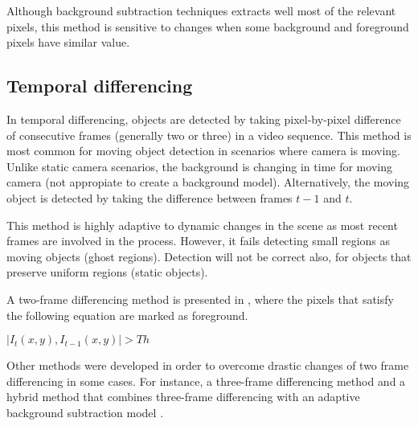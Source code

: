 Although background subtraction techniques extracts well most of the relevant pixels, this method is sensitive to changes when some background and foreground pixels have similar value.

\subsection{Temporal differencing}

In temporal differencing, objects are detected by taking pixel-by-pixel difference of consecutive frames (generally two or three) in a video sequence. This method is most common for moving object detection in scenarios where camera is moving. Unlike static camera scenarios, the background is changing in time for moving camera (not appropiate to create a background model). Alternatively, the moving object is detected by taking the difference between frames $t - 1$ and $t$.

This method is highly adaptive to dynamic changes in the scene as most recent frames are involved in the process. However, it fails detecting small regions as moving objects (ghost regions). Detection will not be correct also, for objects that preserve uniform regions (static objects).

A two-frame differencing method is presented in \cite{Lipton1998a}, where the pixels that satisfy the following equation are marked as foreground.\\
\centerline{$|I_t(x,y), I_{t-1}(x,y)|>Th$}

Other methods were developed in order to overcome drastic changes of two frame differencing in some cases. For instance, a three-frame differencing method \cite{Wang2003} and a hybrid method that combines three-frame differencing with an adaptive background subtraction model \cite{Collins2000}.




